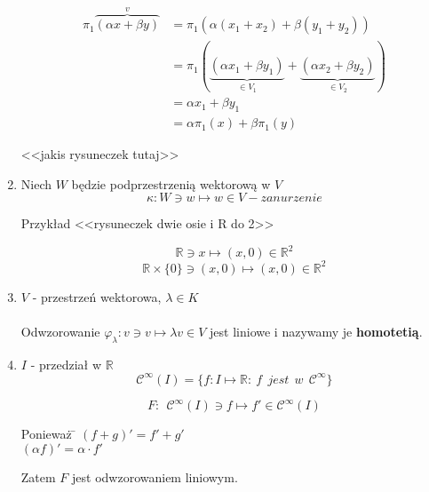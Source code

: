 \documentclass[a5paper,8pt]{article}
\begin{document}
\begin{enumerate}
            \begin{equation*}
                \begin{aligned}
                    \pi_1 \overbrace{(\alpha x + \beta y)}^{v} &= \pi_1 ( \alpha(x_1 + x_2) + \beta(y_1 + y_2))\\
                    & = \pi_1( \underbrace{( \alpha x_1 + \beta y_1 )}_{\in V_1}
                        + \underbrace{( \alpha x_2 + \beta y_2 )}_{\in V_2})\\
                    & = \alpha x_1 + \beta y_1 \\
                    & = \alpha \pi_1(x) + \beta \pi_1(y)
                \end{aligned}
            \end{equation*}

            <<jakis rysuneczek tutaj>>
        \item
            Niech $W$ będzie podprzestrzenią wektorową w $V$\\
            \begin{equation*}
                \kappa: W \ni w \longmapsto w \in V - zanurzenie
            \end{equation*}

            Przykład <<rysuneczek dwie osie i R do 2>>

            \begin{equation*}
                \mathbb{R} \ni x \longmapsto (x,0) \in \mathbb{R}^2
            \end{equation*}
            \begin{equation*}
                \mathbb{R} \times \{0\} \ni (x,0) \longmapsto (x,0) \in \mathbb{R}^2
            \end{equation*}
        \item
            $ V $ - przestrzeń wektorowa, $ \lambda \in K $\\\\
            Odwzorowanie $ \varphi_\lambda: v \ni v \longmapsto \lambda v \in V $
            jest liniowe i nazywamy je \textbf{homotetią}.
        \item
            $ I $ - przedział w $ \mathbb{R} $ \\
            \begin{equation*}
                \mathcal{C}^\infty(I) = \{ f: I \longmapsto \mathbb{R}:
                ~f~~jest~~w~~\mathcal{C}^\infty \}
            \end{equation*}

            \begin{equation*}
                F:~~ \mathcal{C}^\infty(I) \ni f \longmapsto f' \in \mathcal{C}^\infty(I)
            \end{equation*}

            \begin{tabbing}
                Ponieważ \= $ (f+g)' = f' + g' $ \\
                         \> $ (\alpha f)' = \alpha \cdot f' $
            \end{tabbing}

            Zatem $F$ jest odwzorowaniem liniowym.
    \end{enumerate}
\end{document}
